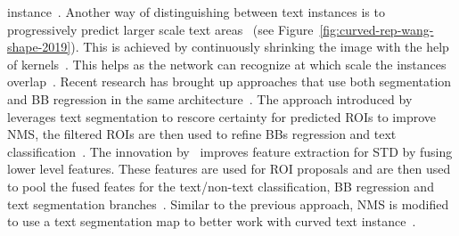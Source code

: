instance~\citep{ferrari_textsnake_2018}.
Another way of distinguishing between text instances is to progressively predict larger scale text
areas~\citep{wang_shape_2019} (see Figure~\ref{fig:curved-rep-wang-shape-2019}).
This is achieved by continuously shrinking the image with the help of
kernels~\citep{wang_shape_2019}.
This helps as the network can recognize at which scale the instances overlap~\citep{wang_shape_2019}.
Recent research has brought up approaches that use both segmentation and \ac{BB} regression in the
same architecture~\citep{xie_scene_2018,dai_fused_2018}.
The approach introduced by~\cite{xie_scene_2018} leverages text segmentation to rescore certainty
for predicted \acp{ROI} to improve \ac{NMS}, the filtered \acp{ROI} are then used to refine
\acp{BB} regression and text classification~\citep{xie_scene_2018}.
The innovation by~\cite{dai_fused_2018} improves feature extraction for \ac{STD} by fusing lower
level features.
These features are used for \ac{ROI} proposals and are then used to pool the fused feates for
the text/non-text classification, \ac{BB} regression and text segmentation
branches~\citep{dai_fused_2018}.
Similar to the previous approach, \ac{NMS} is modified to use a text segmentation map to better
work with curved text instance~\citep{dai_fused_2018,xie_scene_2018}.


